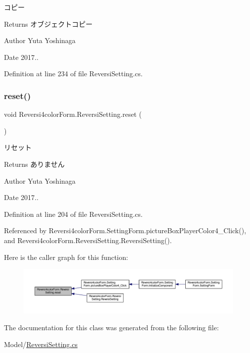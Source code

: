 コピー 

\begin{DoxyReturn}{Returns}
オブジェクトコピー 
\end{DoxyReturn}
\begin{DoxyAuthor}{Author}
Yuta Yoshinaga 
\end{DoxyAuthor}
\begin{DoxyDate}{Date}
2017.. 
\end{DoxyDate}


Definition at line 234 of file Reversi\+Setting.\+cs.

\mbox{\label{class_reversi4color_form_1_1_reversi_setting_abbcc5e30dfee6da2c6e46929fd64dd1f}} 
\subsubsection{\texorpdfstring{reset()}{reset()}}
{\footnotesize\ttfamily void Reversi4color\+Form.\+Reversi\+Setting.\+reset (\begin{DoxyParamCaption}{ }\end{DoxyParamCaption})}



リセット 

\begin{DoxyReturn}{Returns}
ありません 
\end{DoxyReturn}
\begin{DoxyAuthor}{Author}
Yuta Yoshinaga 
\end{DoxyAuthor}
\begin{DoxyDate}{Date}
2017.. 
\end{DoxyDate}


Definition at line 204 of file Reversi\+Setting.\+cs.



Referenced by Reversi4color\+Form.\+Setting\+Form.\+picture\+Box\+Player\+Color4\+\_\+\+Click(), and Reversi4color\+Form.\+Reversi\+Setting.\+Reversi\+Setting().

Here is the caller graph for this function\+:\nopagebreak
\begin{figure}[H]
\begin{center}
\leavevmode
\includegraphics[width=350pt]{class_reversi4color_form_1_1_reversi_setting_abbcc5e30dfee6da2c6e46929fd64dd1f_icgraph}
\end{center}
\end{figure}


The documentation for this class was generated from the following file\+:\begin{DoxyCompactItemize}
\item 
Model/\hyperlink{_reversi_setting_8cs}{Reversi\+Setting.\+cs}\end{DoxyCompactItemize}
